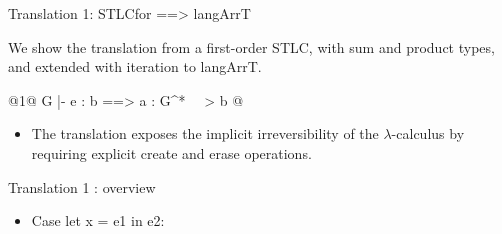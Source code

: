 \documentclass[svgnames,11pt]{beamer}
\newcommand{\lcal}{\ensuremath{\lambda}-calculus\xspace}
\begin{document}
\begin{frame}{Translation 1: {{STLCfor ==> langArrT}} }
  
    \vfill

    \begin{block}

      We show the translation from a first-order {{STLC}}, with sum
      and product types, and extended with iteration to {{langArrT}}.

      \begin{center}
        {{ {@1@ G |- e : b ==> a : G^{*} ~~> b @} }}
      \end{center}
    \end{block}



  \begin{itemize}
    \vfill
  \item The translation exposes the implicit irreversibility of the
    \lcal by requiring explicit {{create}} and {{erase}} operations.

  \end{itemize}
  \vfill

\end{frame}


\begin{frame}{Translation 1 : overview}

  \begin{itemize}


\item Case {{let x = e1 in e2}}:


\begin{center}
\scalebox{1.2}{
}
\end{center}

  \end{itemize}

  
\end{frame}
\end{document}
